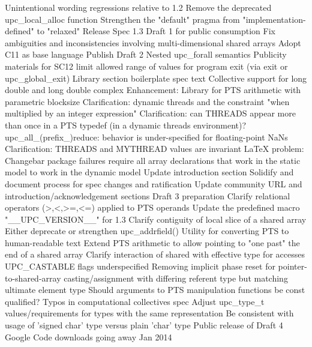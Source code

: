{      \or %
        Unintentional wording regressions relative to 1.2
      \or %
        Remove the deprecated upc\_local\_alloc function
      \or %
        Strengthen the "default" pragma from "implementation-defined" to "relaxed"
      \or %
        Release Spec 1.3 Draft 1 for public consumption
      \or %
        Fix ambiguities and inconsistencies involving multi-dimensional shared arrays
      \or %
        Adopt C11 as base language
      \or %
        Publish Draft 2
      \or %
        Nested upc\_forall semantics
      \or %
        Publicity materials for SC12
      \or %
        limit allowed range of values for program exit (via exit or upc\_global\_exit)
      \or %
        Library section boilerplate spec text
      \or %
        Collective support for long double and long double complex
      \or %
        Enhancement: Library for PTS arithmetic with parametric blocksize
      \or %
        Clarification: dynamic threads and the constraint "when multiplied by an integer expression"
      \or %
        Clarification: can THREADS appear more than once in a PTS typedef (in a dynamic threads environment)?
      \or %
        upc\_all\_(prefix\_)reduce: behavior is under-specified for floating-point NaNs
      \or %
        Clarification: THREADS and MYTHREAD values are invariant
      \or %
        LaTeX problem: Changebar package failures
      \or %
        require all array declarations that work in the static model to work in the dynamic model
      \or %
        Update introduction section
      \or %
        Solidify and document process for spec changes and ratification
      \or %
        Update community URL and introduction/acknowledgement sections
      \or %
        Draft 3 preparation
      \or %
        Clarify relational operators (>,<,>=,<=) applied to PTS operands
      \or %
        Update the predefined macro "\_\_UPC\_VERSION\_\_" for 1.3
      \or %
        Clarify contiguity of local slice of a shared array
      \or %
        Either deprecate or strengthen upc\_addrfield()
      \or %
        Utility for converting PTS to human-readable text
      \or %
        Extend PTS arithmetic to allow pointing to "one past" the end of a shared array
      \or %
        Clarify interaction of shared with effective type for accesses
      \or %
        UPC\_CASTABLE flags underspecified
      \or %
        Removing implicit phase reset for pointer-to-shared-array casting/assignment with differing referent type but matching ultimate element type
      \or %
        Should arguments to PTS manipulation functions be const qualified?
      \or %
        Typos in computational collectives spec
      \or %
        Adjust upc\_type\_t values/requirements for types with the same representation
      \or %
        Be consistent with usage of 'signed char' type versus plain 'char' type
      \or %
        Public release of Draft 4
      \or %
        Google Code downloads going away Jan 2014
    \else
        \empty
    \fi
}
